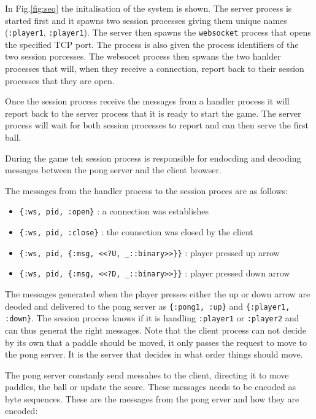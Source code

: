 \documentclass[a4paper,11pt]{article}
\begin{document}
In Fig.\ref{fig:seq} the initalisation of the system is shown. The
server process is started first and it spawns two session processes
giving them unique names ({\tt :player1}, {\tt :player1}). The server
then spawns the {\tt websocket} process that opens the specified TCP
port. The process is also given the process identifiers of the two
session porcesses. The websocet process then spwans the two hanlder
processes that will, when they receive a connection, report back to
their session processes that they are open. 

Once the session process receivs the messages from a handler process
it will report back to the server process that it is ready to start
the game. The server process will wait for both session processes to
report and can then serve the first ball. 

During the game teh session process is responsible for endocding and
decoding messages between the pong server and the client browser.

The messages from the handler process to the session proces are as follows:

\begin{itemize}
\item {\tt \{:ws, pid, :open\}}  : a connection was establishes
\item {\tt \{:ws, pid, :close\}} : the connection was closed by the client
\item {\tt \{:ws, pid, \{:msg,  <<?U, _::binary>>\}\}} : player pressed up arrow
\item {\tt \{:ws, pid, \{:msg,  <<?D, _::binary>>\}\}} : player pressed down arrow
\end{itemize}

The messages generated when the player presses either the up or down
arrow are deoded and delivered to the pong server as {\tt\{:pong1,
  :up\}} and {\tt\{:player1, :down\}}. The session process knows if it
is handling {\tt :player1} or {\tt :player2} and can thus generat the
right messages. Note that the client process can not decide by its own
that a paddle should be moved, it only passes the request to move to
the pong server. It is the server that decides in what order things
should move.

The pong server constanly send messahes to the client, directing it to
move paddles, the ball or update the score. These messages needs to be
encoded as byte sequences. These are the messages from the pong erver
and how they are encoded:
\end{document}
